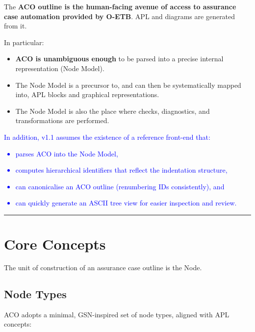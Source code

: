 \documentclass[11pt]{article}
\begin{document}
The \textbf{ACO outline is the human-facing avenue of access to assurance case automation provided by O-ETB}.
APL and diagrams are generated from it.

In particular:
\begin{itemize}[leftmargin=2em]
  \item \textbf{ACO is unambiguous enough} to be parsed into a precise internal representation (Node Model).
  \item The Node Model is a precursor to, and can then be systematically mapped into, APL blocks and graphical representations.
  \item The Node Model is also the place where checks, diagnostics, and transformations are performed.
\end{itemize}

\textcolor{blue}{In addition, v1.1 assumes the existence of a reference front-end that:
\begin{itemize}[leftmargin=2em]
  \item parses ACO into the Node Model,
  \item computes hierarchical identifiers that reflect the indentation structure,
  \item can canonicalise an ACO outline (renumbering IDs consistently), and
  \item can quickly generate an ASCII tree view for easier inspection and review.
\end{itemize}}

\bigskip
\hrule
\bigskip

\section{Core Concepts}
The unit of construction of an assurance case outline is the Node.

\subsection{Node Types}

ACO adopts a minimal, GSN-inspired set of node types, aligned with APL concepts:
\end{document}
